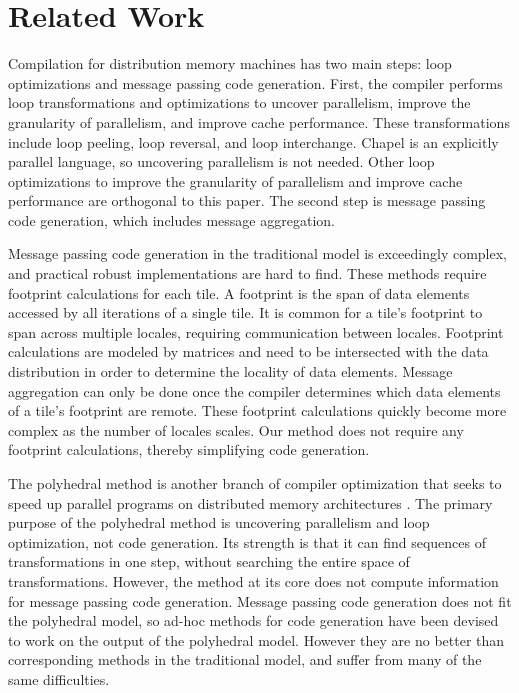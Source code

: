 \section{Related Work}\label{sec:relwork}

Compilation for distribution memory machines has two main steps: loop optimizations and message passing code generation. First, the compiler performs loop transformations and optimizations to uncover parallelism, improve the granularity of parallelism, and improve cache performance. These transformations include loop peeling, loop reversal, and loop interchange. Chapel is an explicitly parallel language, so uncovering parallelism is not needed. Other loop optimizations to improve the granularity of parallelism and improve cache performance are orthogonal to this paper. The second step is message passing code generation, which includes message aggregation.

Message passing code generation in the traditional model is exceedingly complex, and practical robust implementations are hard to find. These methods \cite{goumas2006message, xue1997communication, callahan1988compiling, ramanujam1991compile} require footprint calculations for each tile. A footprint is the span of data elements accessed by all iterations of a single tile. It is common for a tile's footprint to span across multiple locales, requiring communication between locales. Footprint calculations are modeled by matrices and need to be intersected with the data distribution in order to determine the locality of data elements. Message aggregation can only be done once the compiler determines which data elements of a tile's footprint are remote. These footprint calculations quickly become more complex as the number of locales scales. Our method does not require any footprint calculations, thereby simplifying code generation. 

The polyhedral method is another branch of compiler optimization that seeks to speed up parallel programs on distributed memory architectures \cite{chavarria2005effective, germain1995automatic, Gupta91automaticdata, gupta1996compiling, iancu2008performance, wei1998compiling}. The primary purpose of the polyhedral method is uncovering parallelism and loop optimization, not code generation. Its strength is that it can find sequences of transformations in one step, without searching the entire space of transformations. However, the method at its core does not compute information for message passing code generation. Message passing code generation does not fit the polyhedral model, so ad-hoc methods for code generation have been devised to work on the output of the polyhedral model. However they are no better than corresponding methods in the traditional model, and suffer from many of the same difficulties.

